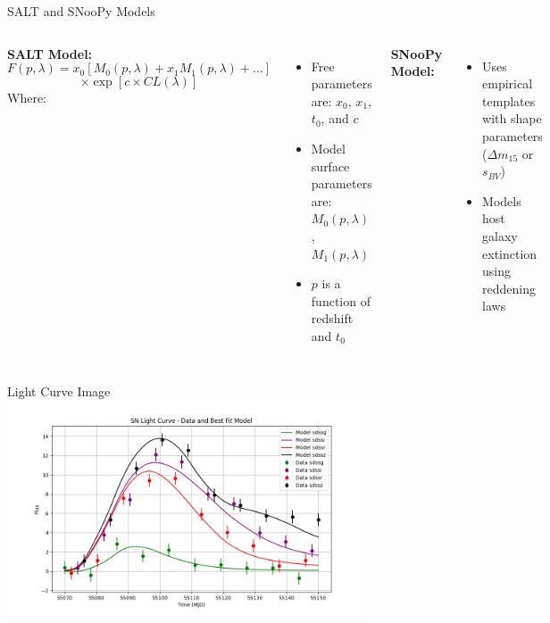 \documentclass[aspectratio=169]{beamer}
\begin{document}
\begin{frame}{SALT and SNooPy Models}
    \begin{columns}[t] %
        \footnotesize
        \textbf{SALT Model:}
        \[
            F(p, \lambda) = x_0 \left[ M_0(p, \lambda) + x_1 M_1(p, \lambda) + \ldots \right] 
            \]
            \[
            \times \exp \left[ c \times CL(\lambda) \right]
        \]
        Where:
        \begin{itemize}
            \item Free parameters are: $x_0$, $x_1$, $t_0$, and $c$
            \item Model surface parameters are: $M_0(p, \lambda)$, $M_1(p, \lambda)$
            \item $p$ is a function of redshift and $t_0$
        \end{itemize}
        
        \footnotesize
        \textbf{SNooPy Model:}
        \begin{itemize}
            \item Uses empirical templates with shape parameters ($\Delta m_{15}$ or $s_{BV}$)
            \item Models host galaxy extinction using reddening laws
        \end{itemize}
    \end{columns}
\end{frame}

\begin{frame}{Light Curve Image}
    \centering
    \includegraphics[width=0.8\textwidth]{images/sncosmo-fitter.png}
\end{frame}
\end{document}

